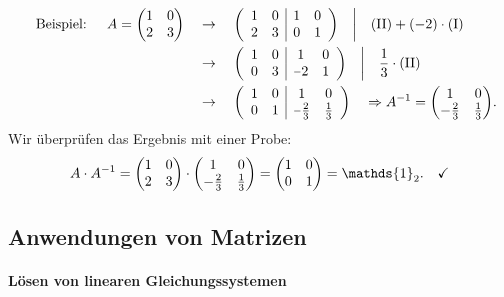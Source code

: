 \begin{align}
    \qq{Beispiel: } A = \mqty(1 & 0 \\ 2 & 3) \quad &\rightarrow \quad \qty(\begin{array}{c c|c c} 
       1 & 0 & 1 & 0 \\
       2 & 3 & 0 & 1 
    \end{array}) \quad \bigg| \quad (\text{II}) + (-2)\cdot (\text{I}) \notag \\
    &\rightarrow \quad \qty(\begin{array}{c c|c c} 
        1 & 0 & 1 & 0 \\
        0 & 3 & \minus2 & 1 
     \end{array}) \quad \bigg| \quad \frac{1}{3}\cdot(\text{II}) \notag \\
     &\rightarrow \quad \qty(\begin{array}{c c|c c} 
        1 & 0 & 1 & 0 \\
        0 & 1 & \minus \frac{2}{3} & \frac{1}{3} 
     \end{array})  \quad \Rightarrow A^{-1} = \mqty(1 & 0 \\-\frac{2}{3} & \frac{1}{3}).
\end{align}
Wir überprüfen das Ergebnis mit einer Probe: 
\begin{align}
    A \cdot A^{-1} = \mqty(1 & 0 \\ 2 & 3) \cdot \mqty(1 & 0 \\-\frac{2}{3} & \frac{1}{3}) = \mqty(1&0\\0&1) = \mathds{1}_2. \quad \checkmark
\end{align}

\subsection{Anwendungen von Matrizen}

\paragraph{Lösen von linearen Gleichungssystemen}$~$

